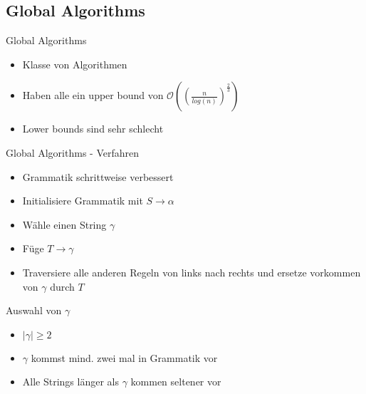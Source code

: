 
\subsection{Global Algorithms}
\begin{frame}{\FrameName}
	\begin{block}{Global Algorithms}
    \begin{itemize}[<+->]
      \item Klasse von Algorithmen
      \item Haben alle ein upper bound von $\mathcal{O}((\frac{n}{log(n)})^{\frac{2}{3}})$
      \item Lower bounds sind sehr schlecht
    \end{itemize}
\end{block}
\end{frame}

\begin{frame}{\FrameName}
	\begin{block}{Global Algorithms - Verfahren}
    \begin{itemize}[<+->]
      \item Grammatik schrittweise verbessert
      \item Initialisiere Grammatik mit $S \rightarrow \alpha$
      \item Wähle einen String $\gamma$
      \item Füge $T \rightarrow \gamma$ 
      \item Traversiere alle anderen Regeln von links nach rechts und ersetze vorkommen von $\gamma$ durch $T$
    \end{itemize}
\end{block}
\end{frame}

\begin{frame}{\FrameName}
	\begin{block}{Auswahl von $\gamma$}
    \begin{itemize}[<+->]
      \item $|\gamma| \ge 2$
      \item $\gamma$ kommst mind. zwei mal in Grammatik vor \linebreak {}
      \item Alle Strings länger als $\gamma$ kommen seltener vor
    \end{itemize}
\end{block}
\end{frame}

